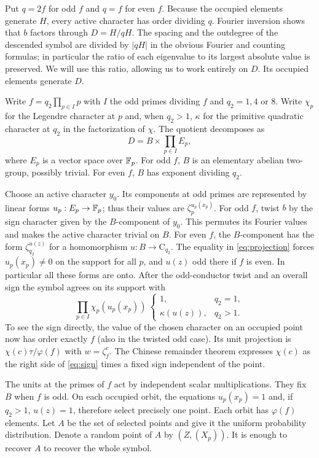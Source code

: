 \documentclass[11pt,letterpaper]{article}
\newcommand{\Cyc}{\mathrm C}
\newcommand{\z}{\zeta}
\begin{document}
Put $q=2f$ for odd $f$ and $q=f$ for even $f$. Because the occupied elements generate $H$, every active character has order dividing $q$. Fourier inversion shows that $b$ factors through $D=H/qH$. The spacing and the outdegree of the descended symbol are divided by $|qH|$ in the obvious Fourier and counting formulas; in particular the ratio of each eigenvalue to its largest absolute value is preserved. We will use this ratio, allowing us to work entirely on $D$. Its occupied elements generate $D$.

Write $f=q_2\prod_{p\in I}p$ with $I$ the odd primes dividing $f$ and $q_2=1,4$ or $8$. Write $\chi_p$ for the Legendre character at $p$ and, when $q_2>1$, $\kappa$ for the primitive quadratic character at $q_2$ in the factorization of $\chi$. The quotient decomposes as
\[
 D=B\times\prod_{p\in I}E_p,
\]
where $E_p$ is a vector space over $\mathbb F_p$. For odd $f$, $B$ is an elementary abelian two-group, possibly trivial. For even $f$, $B$ has exponent dividing $q_2$.

Choose an active character $y_0$. Its components at odd primes are represented by linear forms $u_p:E_p\to\mathbb F_p$; thus their values are $\z_p^{u_p(x_p)}$. For odd $f$, twist $b$ by the sign character given by the $B$-component of $y_0$. This permutes its Fourier values and makes the active character trivial on $B$. For even $f$, the $B$-component has the form $\z_{q_2}^{u(z)}$ for a homomorphism $u:B\to\Cyc_{q_2}$. The equality in \eqref{eq:projection} forces $u_p(x_p)\ne0$ on the support for all $p$, and $u(z)$ odd there if $f$ is even. In particular all these forms are onto. After the odd-conductor twist and an overall sign the symbol agrees on its support with
\begin{equation}\label{eq:sign}
 \prod_{p\in I}\chi_p(u_p(x_p))\ 
 \begin{cases}
 1,&q_2=1,\\
 \kappa(u(z)),&q_2>1 .
 \end{cases}
\end{equation}
To see the sign directly, the value of the chosen character on an occupied point now has order exactly $f$ (also in the twisted odd case). Its unit projection is $\chi(c)\tau/\varphi(f)$ with $w=\z_f^c$. The Chinese remainder theorem expresses $\chi(c)$ as the right side of \eqref{eq:sign} times a fixed sign independent of the point.

The units at the primes of $f$ act by independent scalar multiplications. They fix $B$ when $f$ is odd. On each occupied orbit, the equations $u_p(x_p)=1$ and, if $q_2>1$, $u(z)=1$, therefore select precisely one point. Each orbit has $\varphi(f)$ elements. Let $A$ be the set of selected points and give it the uniform probability distribution. Denote a random point of $A$ by $(Z,(X_p))$. It is enough to recover $A$ to recover the whole symbol.
\end{document}
